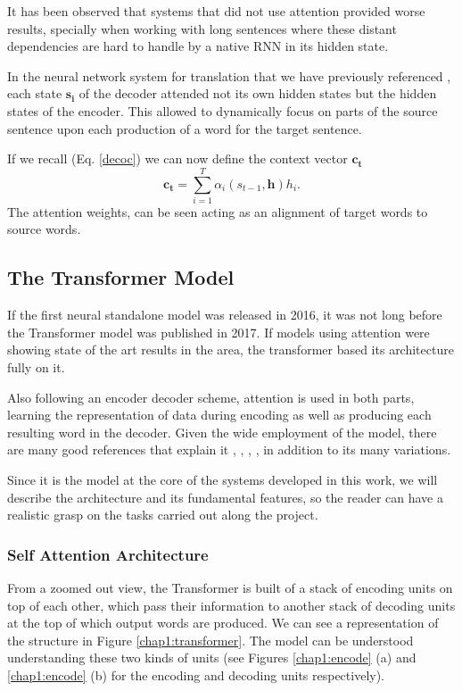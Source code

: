 \documentclass[11pt,english,listoffigures,listoftables]{tfgetsinf}
\newcommand{\vect}[1]{\mathbf{#1}}
\begin{document}
It has been observed that systems that did not use attention provided worse results, specially when working with long sentences where these distant dependencies are hard to handle by a native RNN in its hidden state.

In the neural network system for translation that we have previously referenced \cite{https://doi.org/10.48550/arxiv.1409.0473}, each state $\vect{s_i}$ of the decoder attended not its own hidden states but the hidden states of the encoder. This allowed to dynamically focus on parts of the source sentence upon each production of a word for the target sentence.

If we recall (Eq. \ref{decoc}) we can now define the context vector $\vect{c_t}$
\begin{equation}
    \vect{c_t} = \sum_{i=1}^T\alpha_i(s_{t-1},\vect{h})h_i.
\end{equation}
The attention weights, can be seen acting as an alignment of target words to source words.

\subsection{The Transformer Model}
If the first neural standalone model was released in 2016, it was not long before the Transformer model was published in 2017.
If models using attention were showing state of the art results in the area, the transformer based its architecture fully on it.

Also following an encoder decoder scheme, attention is used in both parts, learning the representation of data during encoding as well as producing each resulting word in the decoder.
Given the wide employment of the model, there are many good references that explain it \cite{https://doi.org/10.48550/arxiv.1706.03762}, \cite{pml1Book}, \cite{zhang2021dive}, \cite{koehn2020neural}, in addition to its many variations.

Since it is the model at the core of the systems developed in this work, we will describe the architecture and its fundamental features, so the reader can have a realistic grasp on the tasks carried out along the project.

\subsubsection{Self Attention Architecture}
From a zoomed out view, the Transformer is built of a stack of encoding units on top of each other, which pass their information to another stack of decoding units at the top of which output words are produced. We can see a representation of the structure in Figure \ref{chap1:transformer}.
The model can be understood understanding these two kinds of units (see Figures \ref{chap1:encode} (a) and \ref{chap1:encode} (b) for the encoding and decoding units respectively).
\end{document}
